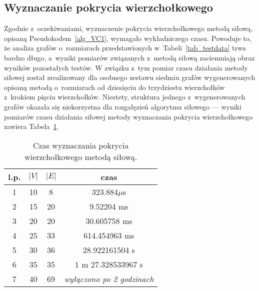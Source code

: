 \subsection{Wyznaczanie pokrycia wierzchołkowego}
\par{
  Zgodnie z~oczekiwaniami, wyznaczenie pokrycia wierzchołkowego metodą siłową, opisaną Pseudokodem~\ref{alg_VC1}, wymagało wykładniczego czasu.
  Powoduje to, że analiza grafów o~rozmiarach przedstawionych w~Tabeli~\ref{tab_testdata} trwa bardzo długo, a~wyniki pomiarów związanych z~metodą siłową zaciemniają obraz wyników pozostałych testów.
  W związku z~tym pomiar czasu działania metody siłowej został zrealizowany dla osobnego zestawu siedmiu grafów wygenerowanych opisaną metodą o~rozmiarach od dziesięciu do trzydziestu wierzchołków z~krokiem pięciu wierzchołków.
  Niestety, struktura jednego z~wygenerowanych grafów okazała się niekorzystna dla rozgałęzień algorytmu siłowego --- wyniki pomiarów czasu działania siłowej metody wyznaczania pokrycia wierzchołkowego zawiera Tabela~\ref{tab_vc_naive}.
  \begin{table}
    \begin{center}
      \caption{Czas wyznaczania pokrycia wierzchołkowego metodą siłową.}
      \begin{tabular}{| c | c | c | c |}
        \hline
        l.p. & $|V|$ & $|E|$ & czas \\ \hline
        1 & 10 & 8 & 323.884$ \mu$s \\
        2 & 15 & 20 & 9.52204 ms \\
        3 & 20 & 20 & 30.605758 ms \\
        4 & 25 & 33 & 614.454963 ms \\
        5 & 30 & 36 & 28.922161504 s \\
        6 & 35 & 35 & 1 m 27.328533967 s \\
        7 & 40 & 69 & \textit{wyłączono po 2 godzinach} \\ \hline
      \end{tabular} 
    \end{center}
    \label{tab_vc_naive}
  \end{table}
}
